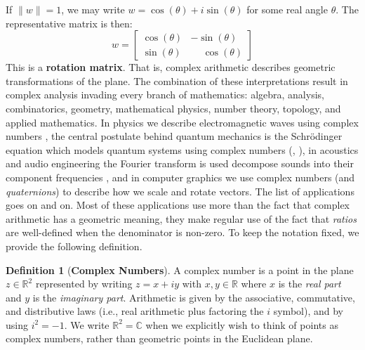 \documentclass{article}
\theoremstyle{definition}
\newtheorem{definition}{Definition}[section]
\begin{document}
        If $\|w\|=1$, we may write $w=\cos(\theta)+i\sin(\theta)$ for some
        real angle $\theta$. The representative matrix is then:
        \begin{equation}
            w=
            \begin{bmatrix}
                \cos(\theta)&-\sin(\theta)\\[0.5em]
                \sin(\theta)&\phantom{+}\cos(\theta)
            \end{bmatrix}
        \end{equation}
        This is a \textbf{rotation matrix}. That is, complex arithmetic
        describes geometric transformations of the plane. The combination
        of these interpretations result in complex analysis invading every
        branch of mathematics: algebra, analysis, combinatorics, geometry,
        mathematical physics, number theory, topology, and applied mathematics.
        In physics we describe electromagnetic waves using complex numbers
        \cite[p.~380]{WangsnessElectromagneticFields}, the central postulate
        behind quantum mechanics is the Schr\"{o}dinger equation which models
        quantum systems using complex numbers
        (\cite[p.~1]{GriffithsQuantumMechanics},
        \cite[p.~68]{McIntyreQuantumMechanics}), in acoustics and
        audio engineering the Fourier transform is used decompose sounds into
        their component frequencies
        \cite[p.~28]{MorseIngbardTheoreticalAcoustics}, and in computer
        graphics we use complex numbers (and \textit{quaternions}) to describe
        how we scale and rotate vectors. The list of applications goes on
        and on. Most of these applications use more than the fact that complex
        arithmetic has a geometric meaning, they make regular use of the fact
        that \textit{ratios} are well-defined when the denominator is
        non-zero. To keep the notation fixed, we provide the following
        definition.
        \begin{definition}[\textbf{Complex Numbers}]
            A complex number is a point in the plane $z\in\mathbb{R}^{2}$
            represented by writing $z=x+iy$ with $x,y\in\mathbb{R}$ where $x$
            is the \textit{real part} and $y$ is the \textit{imaginary part}.
            Arithmetic is given by the associative, commutative, and
            distributive laws (i.e., real arithmetic plus factoring the $i$
            symbol), and by using $i^{2}=-1$. We write
            $\mathbb{R}^{2}=\mathbb{C}$ when we explicitly wish to think of
            points as complex numbers, rather than geometric points in the
            Euclidean plane.
        \end{definition}
\end{document}
